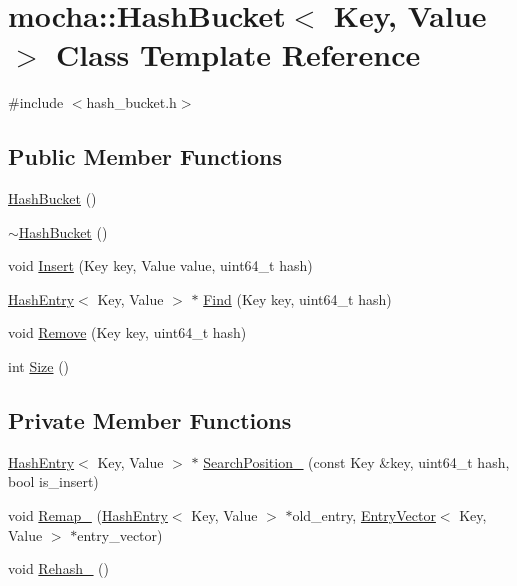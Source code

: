 \hypertarget{classmocha_1_1_hash_bucket}{
\section{mocha::HashBucket$<$ Key, Value $>$ Class Template Reference}
\label{classmocha_1_1_hash_bucket}
}


{\ttfamily \#include $<$hash\_\-bucket.h$>$}

\subsection*{Public Member Functions}
\begin{DoxyCompactItemize}
\item 
\hyperlink{classmocha_1_1_hash_bucket_a7049580fb7e6124549b4620d9616138b}{HashBucket} ()
\item 
\hyperlink{classmocha_1_1_hash_bucket_a41ed7b317cd86a0d1571f85a521a4efc}{$\sim$HashBucket} ()
\item 
void \hyperlink{classmocha_1_1_hash_bucket_a540328f9fd771bbb41704d67d44ebeca}{Insert} (Key key, Value value, uint64\_\-t hash)
\item 
\hyperlink{classmocha_1_1_hash_entry}{HashEntry}$<$ Key, Value $>$ $\ast$ \hyperlink{classmocha_1_1_hash_bucket_aef3dc6b1651258392da4785012d12684}{Find} (Key key, uint64\_\-t hash)
\item 
void \hyperlink{classmocha_1_1_hash_bucket_a919be8f67b2b9ca26e8c28815e2cdacb}{Remove} (Key key, uint64\_\-t hash)
\item 
int \hyperlink{classmocha_1_1_hash_bucket_a0f4d715e5deb247a01b3857c25bf467a}{Size} ()
\end{DoxyCompactItemize}
\subsection*{Private Member Functions}
\begin{DoxyCompactItemize}
\item 
\hyperlink{classmocha_1_1_hash_entry}{HashEntry}$<$ Key, Value $>$ $\ast$ \hyperlink{classmocha_1_1_hash_bucket_a1655c21ed63a2270582240ef0200762a}{SearchPosition\_\-} (const Key \&key, uint64\_\-t hash, bool is\_\-insert)
\item 
void \hyperlink{classmocha_1_1_hash_bucket_afb374610e6b60fd6bf08db19b47c32db}{Remap\_\-} (\hyperlink{classmocha_1_1_hash_entry}{HashEntry}$<$ Key, Value $>$ $\ast$old\_\-entry, \hyperlink{structmocha_1_1_entry_vector}{EntryVector}$<$ Key, Value $>$ $\ast$entry\_\-vector)
\item 
void \hyperlink{classmocha_1_1_hash_bucket_aa35b8924bc434a37b3f01e228f15d523}{Rehash\_\-} ()
\end{DoxyCompactItemize}
